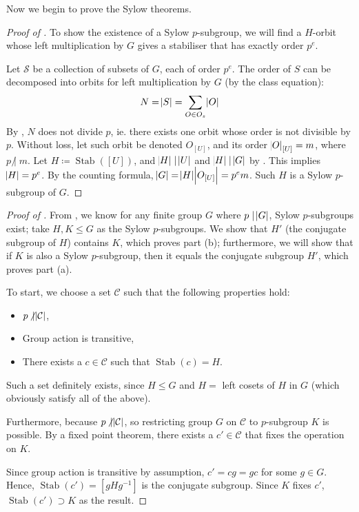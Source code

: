 \documentclass[11pt]{amsart} %
\theoremstyle{definition}
\theoremstyle{definition}
\DeclareMathOperator{\stab}{Stab}
\DeclareMathOperator{\notdiv}{\not|}
\numberwithin{equation}{section}
\begin{document}
Now we begin to prove the Sylow theorems.

\begin{proof}[Proof of ]
	To show the existence of a Sylow $p$-subgroup, we will find a $H$-orbit whose left multiplication by $G$ gives a stabiliser that has exactly order $p^e$.
	
	Let $\mathcal{S}$ be a collection of subsets of $G$, each of order $p^e$. The order of $S$ can be decomposed into orbits for left multiplication by $G$ (by the class equation):
	\begin{align*}
		N = \abs{S} = \sum_{O \in O_s} \abs{O}
	\end{align*}
	By , $N$ does not divide $p$, ie. there exists one orbit whose order is not divisible by $p$. Without loss, let such orbit be denoted $O_{[U]}$, and its order $\abs{O}_{[U]} = m$, where $p \notdiv m$. Let $H \coloneqq \stab([U])$, and $\abs{H} \mid \abs{U}$ and $\abs{H} \mid \abs{G}$ by . This implies $\abs{H} = p^e$. By the counting formula, $\abs{G} = \abs{H} \abs{O_{[U]}} = p^e m$. Such $H$ is a Sylow $p$-subgroup of $G$.
\end{proof}


\begin{proof}[Proof of ]
	From , we know for any finite group $G$ where $p \mid \abs{G}$, Sylow $p$-subgroups exist; take $H, K \leq G$ as the Sylow $p$-subgroups. We show that $H'$ (the conjugate subgroup of $H$) contains $K$, which proves part (b); furthermore, we will show that if $K$ is also a Sylow $p$-subgroup, then it equals the conjugate subgroup $H'$, which proves part (a).
	
	To start, we choose a set $\mathcal{C}$ such that the following properties hold:
	\begin{itemize}
		\item $p \notdiv \abs{\mathcal{C}}$,
		\item Group action is transitive,
		\item There exists a $c \in \mathcal{C}$ such that $\stab(c) = H$.
	\end{itemize} 
	Such a set definitely exists, since $H \leq G$ and $H = $ left cosets of $H$ in $G$ (which obviously satisfy all of the above).
	
	Furthermore, because $p \notdiv \abs{\mathcal{C}}$, so restricting group $G$ on $\mathcal{C}$ to $p$-subgroup $K$ is possible. By a fixed point theorem, there exists a $c' \in \mathcal{C}$ that fixes the operation on $K$. 
	
	Since group action is transitive by assumption, $c' = cg = gc$ for some $g \in G$. Hence, $\stab(c') = [gHg^{-1}]$ is the conjugate subgroup. Since $K$ fixes $c'$, $\stab(c') \supset K$ as the result.
\end{proof}
\end{document}
